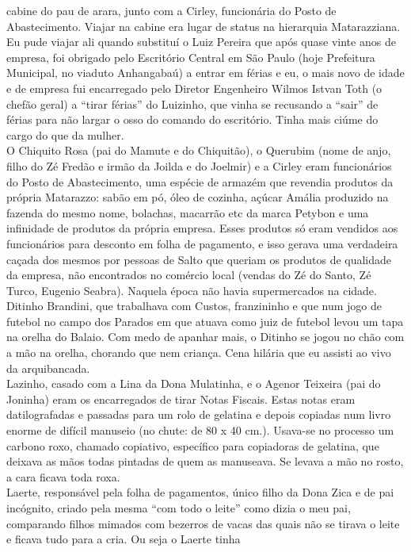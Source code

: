 \documentclass[12pt,brazil,]{book}
\begin{document}
cabine do pau de arara, junto com a Cirley, funcionária do Posto de
Abastecimento. Viajar na cabine era lugar de status na hierarquia
Matarazziana. Eu pude viajar ali quando substituí o Luiz Pereira que
após quase vinte anos de empresa, foi obrigado pelo Escritório Central
em São Paulo (hoje Prefeitura Municipal, no viaduto Anhangabaú) a entrar
em férias e eu, o mais novo de idade e de empresa fui encarregado pelo
Diretor Engenheiro Wilmos Istvan Toth (o chefão geral) a ``tirar
férias'' do Luizinho, que vinha se recusando a ``sair'' de férias para
não largar o osso do comando do escritório. Tinha mais ciúme do cargo do
que da mulher.\\
O Chiquito Rosa (pai do Mamute e do Chiquitão), o Querubim (nome de
anjo, filho do Zé Fredão e irmão da Joilda e do Joelmir) e a Cirley eram
funcionários do Posto de Abastecimento, uma espécie de armazém que
revendia produtos da própria Matarazzo: sabão em pó, óleo de cozinha,
açúcar Amália produzido na fazenda do mesmo nome, bolachas, macarrão etc
da marca Petybon e uma infinidade de produtos da própria empresa. Esses
produtos só eram vendidos aos funcionários para desconto em folha de
pagamento, e isso gerava uma verdadeira caçada dos mesmos por pessoas de
Salto que queriam os produtos de qualidade da empresa, não encontrados
no comércio local (vendas do Zé do Santo, Zé Turco, Eugenio Seabra).
Naquela época não havia supermercados na cidade.\\
Ditinho Brandini, que trabalhava com Custos, franzininho e que num jogo
de futebol no campo dos Parados em que atuava como juiz de futebol levou
um tapa na orelha do Balaio. Com medo de apanhar mais, o Ditinho se
jogou no chão com a mão na orelha, chorando que nem criança. Cena
hilária que eu assisti ao vivo da arquibancada.\\
Lazinho, casado com a Lina da Dona Mulatinha, e o Agenor Teixeira (pai
do Joninha) eram os encarregados de tirar Notas Fiscais. Estas notas
eram datilografadas e passadas para um rolo de gelatina e depois
copiadas num livro enorme de difícil manuseio (no chute: de 80 x 40
cm.). Usava-se no processo um carbono roxo, chamado copiativo,
específico para copiadoras de gelatina, que deixava as mãos todas
pintadas de quem as manuseava. Se levava a mão no rosto, a cara ficava
toda roxa.\\
Laerte, responsável pela folha de pagamentos, único filho da Dona Zica e
de pai incógnito, criado pela mesma ``com todo o leite'' como dizia o
meu pai, comparando filhos mimados com bezerros de vacas das quais não
se tirava o leite e ficava tudo para a cria. Ou seja o Laerte tinha
\end{document}
